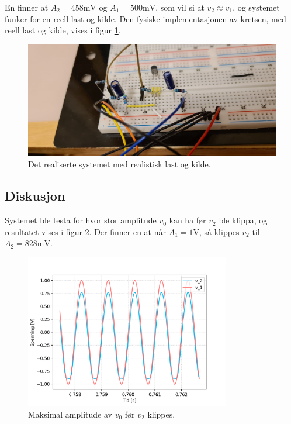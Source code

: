 En finner at $A_2=458\text{mV}$ og $A_1=500\text{mV}$, som vil si at $v_2\approx v_1$, og systemet funker for en reell last og kilde. Den fysiske implementasjonen av kretsen, med reell last og kilde, vises i figur \ref{fig:real-circuit}.

\vspace{1cm}
\begin{figure}[!h]
    \centering
    \includegraphics[width=\textwidth]{img/119455020_3605124586185980_8976253010718534837_n.jpg}
    \caption{Det realiserte systemet med realistisk last og kilde.}
    \label{fig:real-circuit}
\end{figure}
\vspace{1cm}

\clearpage


\subsection{Diskusjon}
Systemet ble testa for hvor stor amplitude $v_0$ kan ha før $v_2$ ble klippa, og resultatet vises i figur \ref{fig:v0max}. Der finner en at når $A_1=1\text{V}$, så klippes $v_2$ til $A_2=828\text{mV}$.

\vspace{1cm}
\vspace{1cm}
\begin{figure}[!h]
    \centering
    \includegraphics[width=0.8\textwidth]{img/v0max.png}
    \caption{Maksimal amplitude av $v_0$ før $v_2$ klippes.}
    \label{fig:v0max}
\end{figure}
\vspace{1cm}

